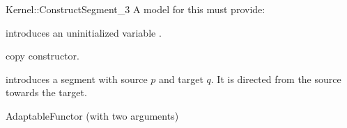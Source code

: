 \begin{ccRefFunctionObjectConcept}{Kernel::ConstructSegment_3}
A model for this must provide:



\ccHidden {}
             {introduces an uninitialized variable .}

\ccHidden {}
            {copy constructor.}

            {introduces a segment  with source $p$
             and target $q$. It is directed from the source towards
             the target.}


\ccRefines
AdaptableFunctor (with two arguments)

\ccSeeAlso
{}\\

\end{ccRefFunctionObjectConcept}

